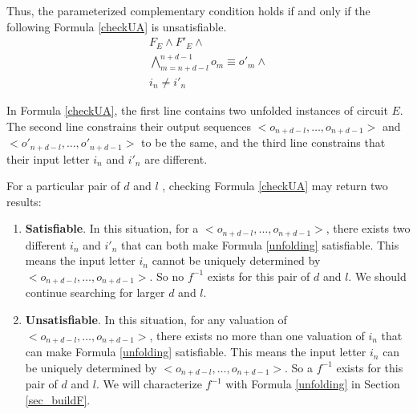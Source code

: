 \documentclass[journal]{IEEEtran}
\begin{document}
Thus,
the parameterized complementary condition holds if and only if the following Formula \ref{checkUA} is unsatisfiable.
\begin{equation}\label{checkUA}
\begin{array}{c}
F_E \wedge F'_E\wedge \\
\bigwedge_{m=n+d-l}^{n+d-1}o_m\equiv o'_m\wedge \\
i_n\ne i'_n
\end{array}
\end{equation}

In Formula \ref{checkUA},
the first line contains two unfolded instances of circuit $E$.
The second line constrains their output sequences $<o_{n+d-l},\dots , o_{n+d-1} >$ and $<o'_{n+d-l},\dots , o'_{n+d-1} >$ to be the same,
and the third line constrains that their input letter $i_n$ and $i'_n$ are different.

For a particular pair of $d$ and $l$ , checking Formula \ref{checkUA} may return two results:
\begin{enumerate}
\item \textbf{Satisfiable}. In this situation,
      for a $<o_{n+d-l},\dots , o_{n+d-1} >$,
      there exists two different $i_n$ and $i'_n$ that can both make Formula \ref{unfolding} satisfiable.
      This means the input letter $i_n$ cannot be uniquely determined by $<o_{n+d-l},\dots , o_{n+d-1} >$.
      So no $f^{-1}$ exists for this pair of $d$ and $l$.
      We should continue searching for larger $d$ and $l$.
\item \textbf{Unsatisfiable}. In this situation,
      for any valuation of $<o_{n+d-l},\dots , o_{n+d-1} >$,
      there exists no more than one valuation of $i_n$ that can make Formula \ref{unfolding} satisfiable.
      This means the input letter $i_n$ can be uniquely determined by $<o_{n+d-l},\dots , o_{n+d-1} >$.
      So a $f^{-1}$ exists for this pair of $d$ and $l$.
      We will characterize $f^{-1}$ with Formula \ref{unfolding} in Section \ref{sec_buildF}.
\end{enumerate}
\end{document}
